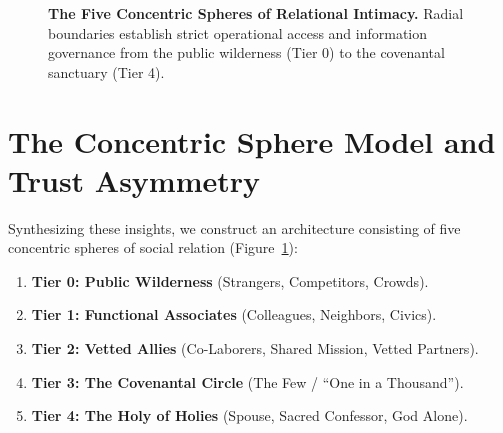 \documentclass[11pt,twocolumn]{article}
\begin{document}
\begin{figure}[t]
\caption{\textbf{The Five Concentric Spheres of Relational Intimacy.} Radial boundaries establish strict operational access and information governance from the public wilderness (Tier 0) to the covenantal sanctuary (Tier 4).}
\label{fig:concentric}
\end{figure}

\section{The Concentric Sphere Model and Trust Asymmetry}

Synthesizing these insights, we construct an architecture consisting of five concentric spheres of social relation (Figure~\ref{fig:concentric}):
\begin{enumerate}
    \item \textbf{Tier 0: Public Wilderness} (Strangers, Competitors, Crowds).
    \item \textbf{Tier 1: Functional Associates} (Colleagues, Neighbors, Civics).
    \item \textbf{Tier 2: Vetted Allies} (Co-Laborers, Shared Mission, Vetted Partners).
    \item \textbf{Tier 3: The Covenantal Circle} (The Few / ``One in a Thousand'').
    \item \textbf{Tier 4: The Holy of Holies} (Spouse, Sacred Confessor, God Alone).
\end{enumerate}
\end{document}
